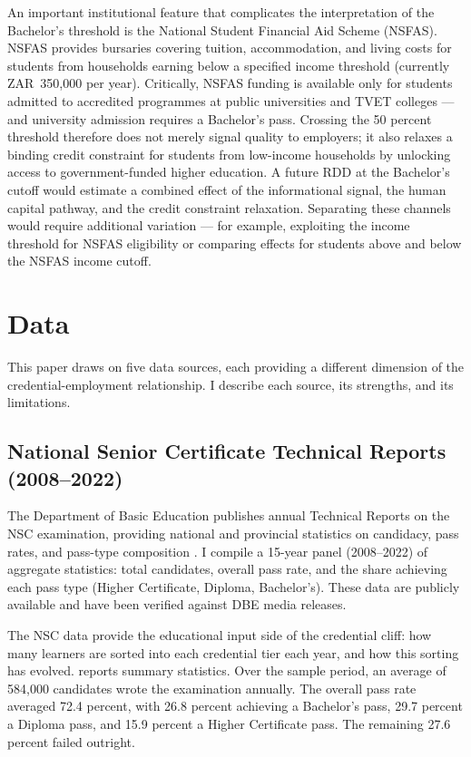 \documentclass[12pt]{article}
\begin{document}
An important institutional feature that complicates the interpretation of the Bachelor's threshold is the National Student Financial Aid Scheme (NSFAS). NSFAS provides bursaries covering tuition, accommodation, and living costs for students from households earning below a specified income threshold (currently ZAR~350{,}000 per year). Critically, NSFAS funding is available only for students admitted to accredited programmes at public universities and TVET colleges --- and university admission requires a Bachelor's pass. Crossing the 50 percent threshold therefore does not merely signal quality to employers; it also relaxes a binding credit constraint for students from low-income households by unlocking access to government-funded higher education. A future RDD at the Bachelor's cutoff would estimate a combined effect of the informational signal, the human capital pathway, and the credit constraint relaxation. Separating these channels would require additional variation --- for example, exploiting the income threshold for NSFAS eligibility or comparing effects for students above and below the NSFAS income cutoff.


\section{Data}
\label{sec:data}

This paper draws on five data sources, each providing a different dimension of the credential-employment relationship. I describe each source, its strengths, and its limitations.

\subsection{National Senior Certificate Technical Reports (2008--2022)}

The Department of Basic Education publishes annual Technical Reports on the NSC examination, providing national and provincial statistics on candidacy, pass rates, and pass-type composition \citep{dbe2022nsc}. I compile a 15-year panel (2008--2022) of aggregate statistics: total candidates, overall pass rate, and the share achieving each pass type (Higher Certificate, Diploma, Bachelor's). These data are publicly available and have been verified against DBE media releases.

The NSC data provide the educational input side of the credential cliff: how many learners are sorted into each credential tier each year, and how this sorting has evolved.  reports summary statistics. Over the sample period, an average of 584{,}000 candidates wrote the examination annually. The overall pass rate averaged 72.4 percent, with 26.8 percent achieving a Bachelor's pass, 29.7 percent a Diploma pass, and 15.9 percent a Higher Certificate pass. The remaining 27.6 percent failed outright.
\end{document}
